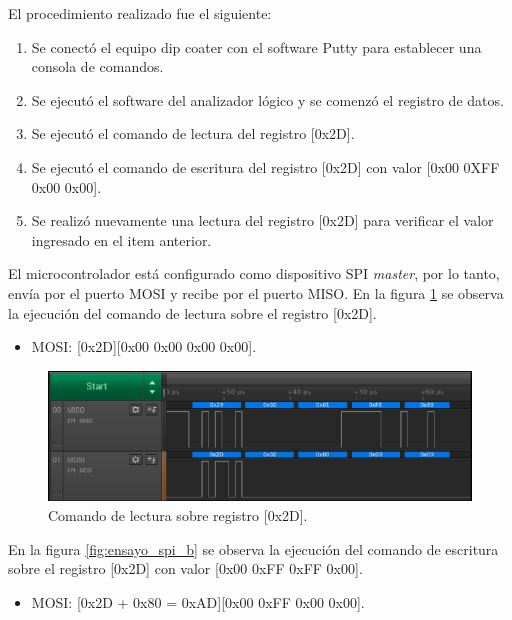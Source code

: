El procedimiento realizado fue el siguiente:
\begin{enumerate}
\item Se conectó el equipo dip coater con el software Putty para establecer una consola de comandos.
\item Se ejecutó el software del analizador lógico y se comenzó el registro de datos.
\item Se ejecutó el comando de lectura del registro [0x2D].
\item Se ejecutó el comando de escritura del registro [0x2D] con valor [0x00 0XFF 0x00 0x00].
\item Se realizó nuevamente una lectura del registro [0x2D] para verificar el valor ingresado en el item anterior. 
\end{enumerate}

El microcontrolador está configurado como dispositivo SPI \textit{master}, por lo tanto, envía por el puerto MOSI y recibe por el puerto MISO.
En la figura \ref{fig:ensayo_spi_a} se observa la ejecución del comando de lectura sobre el registro [0x2D]. 
\begin{itemize}
\item MOSI: [0x2D][0x00 0x00 0x00 0x00].
\end{itemize}



\begin{figure}[h!]
\centering 
\includegraphics[width=1\textwidth]{./Figures/ensayo_spi_a_v1.png}
\caption{Comando de lectura sobre registro [0x2D].}
\label{fig:ensayo_spi_a}
\end{figure}


En la figura \ref{fig:ensayo_spi_b} se observa la ejecución del comando de escritura sobre el registro [0x2D] con valor [0x00 0xFF 0xFF 0x00]. 

\begin{itemize}
\item MOSI: [0x2D + 0x80 = 0xAD][0x00 0xFF 0x00 0x00].
\end{itemize}



